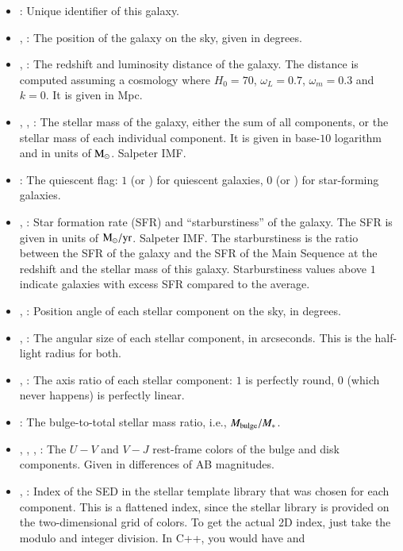 \documentclass[12pt,a4paper]{article}
\newcommand{\msun}{{\rm M}_\odot}
\begin{document}
\begin{itemize}
\item {}: Unique identifier of this galaxy.
\item {}, : The position of the galaxy on the sky, given in degrees.
\item {}, : The redshift and luminosity distance of the galaxy. The distance is computed assuming a cosmology where $H_0=70$, $\omega_L=0.7$, $\omega_m = 0.3$ and $k=0$. It is given in Mpc.
\item {}, , : The stellar mass of the galaxy, either the sum of all components, or the stellar mass of each individual component. It is given in base-$10$ logarithm and in units of $\msun$. Salpeter IMF.
\item {}: The quiescent flag: $1$ (or ) for quiescent galaxies, $0$ (or ) for star-forming galaxies.
\item {}, : Star formation rate (SFR) and ``starburstiness'' of the galaxy. The SFR is given in units of $\msun/{\rm yr}$. Salpeter IMF. The starburstiness is the ratio between the SFR of the galaxy and the SFR of the Main Sequence at the redshift and the stellar mass of this galaxy. Starburstiness values above $1$ indicate galaxies with excess SFR compared to the average.
\item {}, : Position angle of each stellar component on the sky, in degrees.
\item {}, : The angular size of each stellar component, in arcseconds. This is the half-light radius for both.
\item {}, : The axis ratio of each stellar component: $1$ is perfectly round, $0$ (which never happens) is perfectly linear.
\item {}: The bulge-to-total stellar mass ratio, i.e., $M_{\rm bulge}/M_*$.
\item {}, , , : The $U-V$ and $V-J$ rest-frame colors of the bulge and disk components. Given in differences of AB magnitudes.
\item {}, : Index of the SED in the stellar template library that was chosen for each component. This is a flattened index, since the stellar library is provided on the two-dimensional grid of colors. To get the actual 2D index, just take the modulo and integer division. In C++, you would have  and \cppinline{ivj = opt_sed%
}
\end{itemize}
\end{document}

